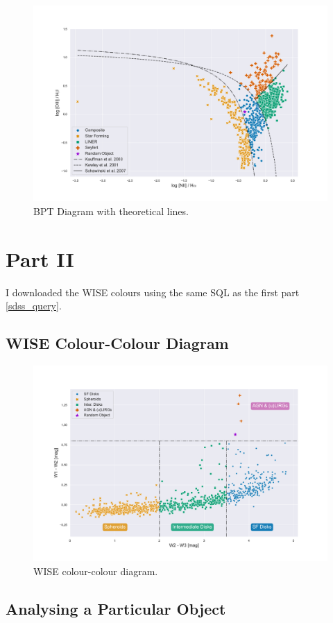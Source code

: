 \documentclass[letterpaper, oneside]{article}
\begin{document}
\begin{figure}[h]
	\centering
	\includegraphics[width=1.1\textwidth]{../BPT_with_lines_and_random.pdf}
	\caption{BPT Diagram with theoretical lines.}
	\label{fig:BPT_line}
\end{figure}


\section{Part II}

I downloaded the WISE colours \cite{Wright_2010} using the same SQL as the first part \ref{sdss_query}.

\subsection{WISE Colour-Colour Diagram}

\cite{Jarrett_2017}

\begin{figure}[h]
	\centering
	\includegraphics[width=1.1\textwidth]{../wise_color_color.pdf}
	\caption{WISE colour-colour diagram.}
	\label{fig:wise_colours}
\end{figure}

\subsection{Analysing a Particular Object}






\end{document}
